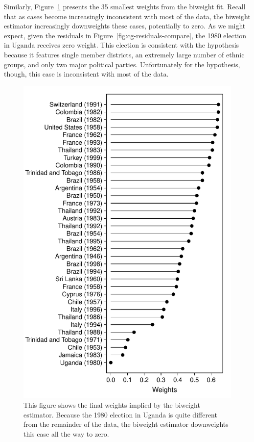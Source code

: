 \documentclass[12pt]{article}
\begin{document}
Similarly, Figure~\ref{fig:cg-weights} presents the 35 smallest weights from the biweight fit. 
Recall that as cases become increasingly inconsistent with most of the data, the biweight estimator increasingly downweights these cases, potentially to zero. 
As we might expect, given the residuals in Figure~\ref{fig:cg-residuals-compare}, the 1980 election in Uganda receives zero weight. 
This election is consistent with the hypothesis because it features single member districts, an extremely large number of ethnic groups, and only two major political parties. 
Unfortunately for the hypothesis, though, this case is inconsistent with most of the data.

\begin{figure}[h!]
\begin{center}
\includegraphics[scale = 0.7]{figs/cg-weights.pdf}
\caption{This figure shows the final weights implied by the biweight estimator. 
Because the 1980 election in Uganda is quite different from the remainder of the data, the biweight estimator downweights this case all the way to zero.}\label{fig:cg-weights}
\end{center}
\end{figure}
\end{document}
